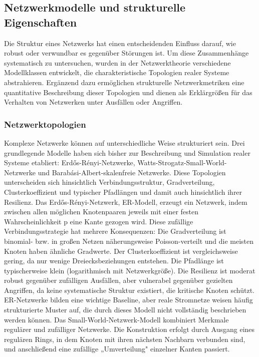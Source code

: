 \subsection{Netzwerkmodelle und strukturelle Eigenschaften}
Die Struktur eines Netzwerks hat einen entscheidenden Einfluss darauf, wie robust oder verwundbar es gegenüber Störungen ist. Um diese Zusammenhänge systematisch zu untersuchen, wurden in der Netzwerktheorie verschiedene Modellklassen entwickelt, die charakteristische Topologien realer Systeme abstrahieren. Ergänzend dazu ermöglichen strukturelle Netzwerkmetriken eine quantitative Beschreibung dieser Topologien und dienen als Erklärgrößen für das Verhalten von Netzwerken unter Ausfällen oder Angriffen.
\subsubsection{Netzwerktopologien}
Komplexe Netzwerke können auf unterschiedliche Weise strukturiert sein. Drei grundlegende Modelle haben sich bisher zur Beschreibung und Simulation realer Systeme etabliert: Erdős-Rényi-Netzwerke, Watts-Strogatz-Small-World-Netzwerke und Barabási-Albert-skalenfreie Netzwerke. Diese Topologien unterscheiden sich hinsichtlich Verbindungsstruktur, Gradverteilung, Clusterkoeffizient und typischer Pfadlängen und damit auch hinsichtlich ihrer Resilienz.
Das Erdős-Rényi-Netzwerk, ER-Modell, \citep{Erdos1959RandomGraphs} erzeugt ein Netzwerk, indem zwischen allen möglichen Knotenpaaren jeweils mit einer festen Wahrscheinlichkeit p eine Kante gezogen wird. Diese zufällige Verbindungsstrategie hat mehrere Konsequenzen:
	Die Gradverteilung ist binomial- bzw. in großen Netzen näherungsweise Poisson-verteilt und die meisten Knoten haben ähnliche Gradwerte.
	Der Clusterkoeffizient ist vergleichsweise gering, da nur wenige Dreiecksbeziehungen entstehen.
	Die Pfadlänge ist typischerweise klein (logarithmisch mit Netzwerkgröße).
	Die Resilienz ist moderat robust gegenüber zufälligen Ausfällen, aber vulnerabel gegenüber gezielten Angriffen, da keine systematische Struktur existiert, die kritische Knoten schützt.
ER-Netzwerke bilden eine wichtige Baseline, aber reale Stromnetze weisen häufig strukturierte Muster auf, die durch dieses Modell nicht vollständig beschrieben werden können.
Das Small-World-Netzwerk-Modell \citep{Watts1998SmallWorld} kombiniert Merkmale regulärer und zufälliger Netzwerke. Die Konstruktion erfolgt durch Ausgang eines regulären Rings, in dem Knoten mit ihren nächsten Nachbarn verbunden sind, und anschließend eine zufällige „Umverteilung" einzelner Kanten passiert.
